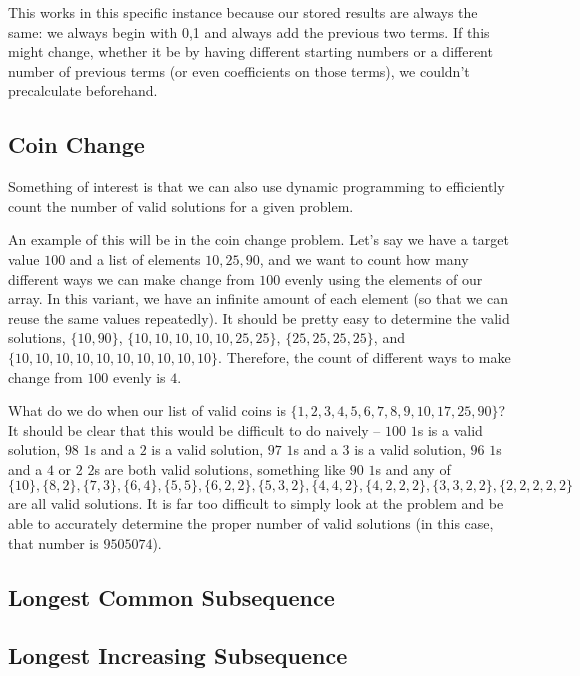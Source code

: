 This works in this specific instance because our stored results are always the same: we always begin with {0,1} and always add the previous two terms. If this might change, whether it be by having different starting numbers or a different number of previous terms (or even coefficients on those terms), we couldn't precalculate beforehand.

\subsection{Coin Change}

Something of interest is that we can also use dynamic programming to efficiently count the number of valid solutions for a given problem.

An example of this will be in the coin change problem. Let's say we have a target value $100$ and a list of elements $10,25,90$, and we want to count how many different ways we can make change from $100$ evenly using the elements of our array. In this variant, we have an infinite amount of each element (so that we can reuse the same values repeatedly). It should be pretty easy to determine the valid solutions, $\{10,90\}$, $\{10,10,10,10,10,25,25\}$, $\{25,25,25,25\}$, and $\{10,10,10,10,10,10,10,10,10,10\}$. Therefore, the count of different ways to make change from $100$ evenly is $4$.

What do we do when our list of valid coins is $\{1,2,3,4,5,6,7,8,9,10,17,25,90\}$? It should be clear that this would be difficult to do naively -- $100$ $1$s is a valid solution, $98$ $1$s and a $2$ is a valid solution, $97$ $1$s and a $3$ is a valid solution, $96$ $1$s and a $4$ or $2$ $2$s are both valid solutions, something like $90$ $1$s and any of $\{10\},\{8,2\},\{7,3\},\{6,4\},\{5,5\},\{6,2,2\},\{5,3,2\},\{4,4,2\},\{4,2,2,2\},\{3,3,2,2\},\{2,2,2,2,2\}$ are all valid solutions. It is far too difficult to simply look at the problem and be able to accurately determine the proper number of valid solutions (in this case, that number is $9505074$).

\subsection{Longest Common Subsequence}

\subsection{Longest Increasing Subsequence}
